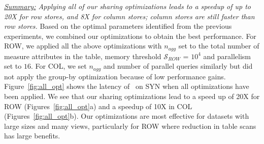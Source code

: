 {\em \underline{Summary:} Applying all of our sharing optimizations
leads to a speedup of up to 20X for row stores, and 8X for column stores;
column stores are still faster than row stores.}
Based on the optimal parameters identified from the previous experiments, we combined 
our optimizations to obtain the best performance. 
For ROW, we applied all the above optimizations with $n_{agg}$ set to
the total number of measure attributes in the table, memory threshold $\mathcal{S}_{ROW}$ 
= $10^4$ and parallelism set to $16$.
For COL, we set $n_{agg}$ and number of parallel queries similarly
but did not apply the group-by optimization because of low performance gains. 
Figure~\ref{fig:all_opt} shows the latency of \SeeDB\ on SYN when all
optimizations have been applied.
We see that our sharing optimizations lead to a speed up of 20X for ROW 
(Figures~\ref{fig:all_opt}a) and a speedup of 10X in COL (Figures~\ref{fig:all_opt}b). 
Our optimizations are most effective for datasets with 
large sizes and many views, particularly for ROW where reduction in table scans has 
large benefits.


